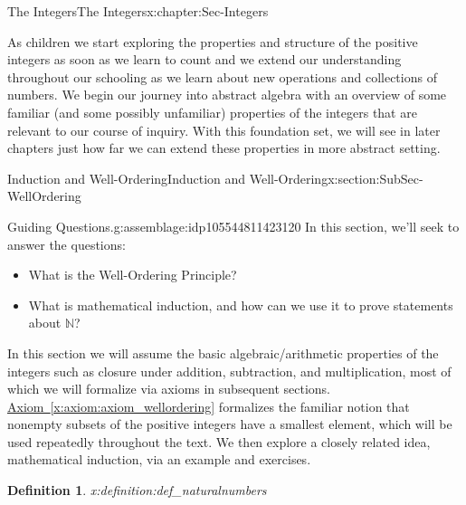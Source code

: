 \documentclass[oneside,10pt,]{book}
\newcommand{\xreffont}{\relax}
\numberwithin{equation}{section}
\def\N{{\mathbb N}}
\newtheorem{definition}[theorem]{Definition}
\begin{document}
\tableofcontents
\mainmatter
%
%
\typeout{************************************************}
\typeout{************************************************}
%
\begin{chapterptx}{The Integers}{}{The Integers}{}{}{x:chapter:Sec-Integers}
\begin{introduction}{}%
As children we start exploring the properties and structure of the positive integers as soon as we learn to count and we extend our understanding throughout our schooling as we learn about new operations and collections of numbers. We begin our journey into abstract algebra with an overview of some familiar (and some possibly unfamiliar) properties of the integers that are relevant to our course of inquiry. With this foundation set, we will see in later chapters just how far we can extend these properties in more abstract setting.%
\end{introduction}%
%
%
\typeout{************************************************}
\typeout{************************************************}
%
\begin{sectionptx}{Induction and Well-Ordering}{}{Induction and Well-Ordering}{}{}{x:section:SubSec-WellOrdering}
\begin{assemblage}{Guiding Questions.}{g:assemblage:idp105544811423120}%
In this section, we'll seek to answer the questions: %
\begin{itemize}[label=\textbullet]
\item{}What is the Well-Ordering Principle?%
\item{}What is mathematical induction, and how can we use it to prove statements about \(\N\)?%
\end{itemize}
%
\end{assemblage}
\begin{introduction}{}%
In this section we will assume the basic algebraic\slash{}arithmetic properties of the integers such as closure under addition, subtraction, and multiplication, most of which we will formalize via axioms in subsequent sections. \hyperref[x:axiom:axiom_wellordering]{Axiom~{\xreffont\ref{x:axiom:axiom_wellordering}}} formalizes the familiar notion that nonempty subsets of the positive integers have a smallest element, which will be used repeatedly throughout the text. We then explore a closely related idea, mathematical induction, via an example and exercises.%
\end{introduction}%
\begin{definition}{}{x:definition:def_naturalnumbers}%

\end{definition}
\end{sectionptx}
\end{chapterptx}
\end{document}
